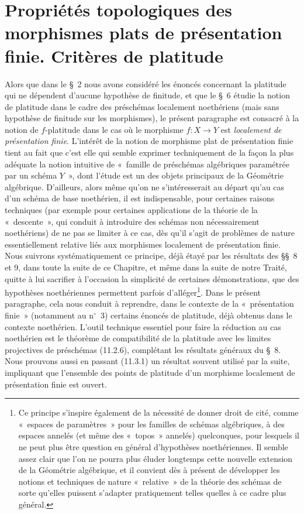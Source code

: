 \section{Propriétés topologiques des morphismes plats de présentation finie. Critères de platitude}
\label{section:IV.11-fr}

Alors que dans le \S~2 nous avons considéré les énoncés concernant la platitude
qui ne dépendent d'aucune hypothèse de finitude, et que le \S~6 étudie la notion
de platitude dans le cadre des préschémas localement noethériens (mais sans
hypothèse de finitude sur les morphismes), le présent paragraphe est consacré à
la notion de $f$-platitude dans le cas où le morphisme $f:X\to Y$ est
\emph{localement de présentation finie}. L'intérêt de la notion de morphisme
plat de présentation finie tient au fait que c'est elle qui semble exprimer
techniquement de la façon la plus adéquate la notion intuitive de «~famille de
préschémas algébriques paramétrée par un schéma $Y$~», dont l'étude est un des
objets principaux de la Géométrie algébrique. D'ailleurs, alors même qu'on ne
s'intéresserait au départ qu'au cas d'un schéma de base noethérien, il est
indispensable, pour certaines raisons techniques (par exemple pour certaines
applications de la théorie de la «~descente~», qui conduit à introduire des
schémas non nécessairement noethériens) de ne pas se limiter à ce cas, dès
qu'il s'agit de problèmes de nature essentiellement relative liés aux
morphismes localement de présentation finie. Nous suivrons systématiquement ce
principe, déjà étayé par les résultats des \S\S~8 et 9, dans toute la suite de ce
Chapitre, et même dans la suite de notre Traité, quitte à lui sacrifier à
l'occasion la simplicité de certaines démonstrations, que des hypothèses
noethériennes permettent parfois d'alléger\footnote{Ce principe s'inspire
également de la nécessité de donner droit de cité, comme «~espaces de
paramètres~» pour les familles de schémas algébriques, à des espaces annelés
(et même des «~topos~» annelés) quelconques, pour lesquels il ne peut plus être
question en général d'hypothèses noethériennes. Il semble assez clair que l'on
ne pourra plus éluder longtemps cette nouvelle extension de la Géométrie
algébrique, et il convient dès à présent de développer les notions et
techniques de nature «~relative~» de la théorie des schémas de sorte qu'elles
puissent s'adapter pratiquement telles quelles à ce cadre plus général.}. Dans
le présent paragraphe, cela nous conduit à reprendre, dans le contexte de la
«~présentation finie~» (notamment au n$^\circ$~3) certains énoncés de platitude,
déjà obtenus dans le contexte noethérien. L'outil technique essentiel pour
faire la réduction au cas noethérien est le théorème de compatibilité de la
platitude avec les limites projectives de préschémas (11.2.6), complétant les
résultats généraux du \S~8. Nous prouvons aussi en passant (11.3.1) un résultat
souvent utilisé
par la suite, impliquant que l'ensemble des points de platitude d'un morphisme
localement de présentation finie est ouvert.

